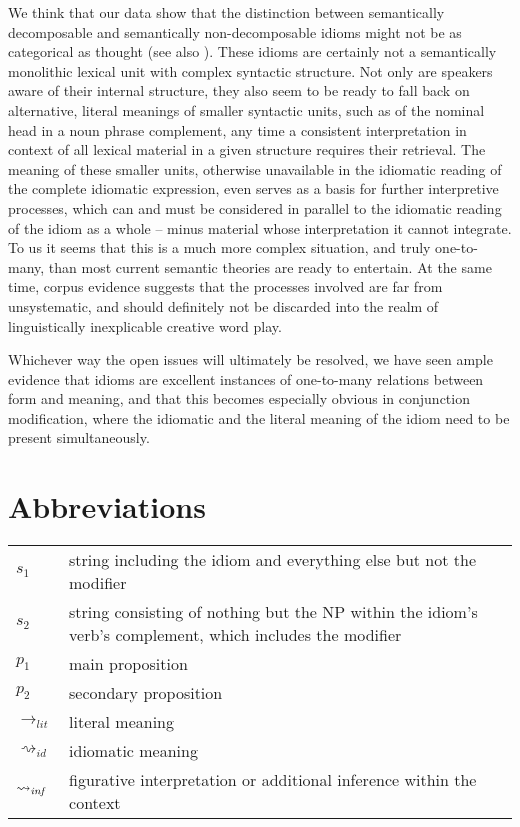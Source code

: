 \documentclass[output=paper]{langsci/langscibook}
\begin{document}
We think that our data show that the distinction between semantically decomposable and semantically non-decomposable idioms might not be as categorical as \citet{Nunberg:al:94} thought (see also \citealt{bargmannsailerta}). These idioms are certainly not a semantically monolithic lexical unit with complex syntactic structure. Not only are speakers aware of their internal structure, they also seem to be ready to fall back on alternative, literal meanings of smaller syntactic units, such as of the nominal head in a noun phrase complement, any time a consistent interpretation in context of all lexical material in a given structure requires their retrieval. The meaning of these smaller units, otherwise unavailable in the idiomatic reading of the complete idiomatic expression, even serves as a basis for further interpretive processes, which can and must be considered in parallel to the idiomatic reading of the idiom as a whole -- minus material whose interpretation it cannot integrate. To us it seems that this is a much more complex situation, and truly one-to-many, than most current semantic theories are ready to entertain. At the same time, corpus evidence suggests that the processes involved are far from unsystematic, and should definitely not be discarded into the realm of linguistically inexplicable creative word play.

Whichever way the open issues will ultimately be resolved, we have seen ample evidence that idioms are excellent instances of one-to-many relations between form and meaning, and that this becomes especially obvious in conjunction modification, where the idiomatic and the literal meaning of the idiom need to be present simultaneously.

\section*{Abbreviations}
\begin{tabularx}{\textwidth}{@{}lQ@{}}
$s_{1}$	& string including the idiom and everything else but not the modifier \\
$s_{2}$ & string consisting of nothing but the NP within the idiom's verb's complement, which includes the modifier \\
$p_{1}$	& main proposition \\
$p_{2}$	& secondary proposition \\
$\rightarrow_{lit}$	& literal meaning \\
$\rightsquigarrow_{id}$ & idiomatic meaning \\
$\rightsquigarrow_{\text{\itshape inf}}$ & figurative interpretation or additional inference within the context
\end{tabularx}
\end{document}
